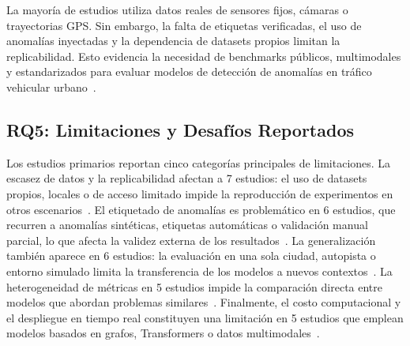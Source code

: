 \documentclass[12pt, a4paper]{article}
\begin{document}
\begin{hallazgo}[]
La mayor\'{i}a de estudios utiliza datos reales de sensores fijos, c\'{a}maras o trayectorias GPS. Sin embargo, la falta de etiquetas verificadas, el uso de anomal\'{i}as inyectadas y la dependencia de datasets propios limitan la replicabilidad. Esto evidencia la necesidad de benchmarks p\'{u}blicos, multimodales y estandarizados para evaluar modelos de detecci\'{o}n de anomal\'{i}as en tr\'{a}fico vehicular urbano~\cite{taheri2026applicability}.
\end{hallazgo}

\subsection{RQ5: Limitaciones y Desaf\'{i}os Reportados}

Los estudios primarios reportan cinco categor\'{i}as principales de limitaciones. La escasez de datos y la replicabilidad afectan a 7 estudios: el uso de datasets propios, locales o de acceso limitado impide la reproducci\'{o}n de experimentos en otros escenarios~\cite{fang2020deep,mao2024detecting,giasemis2025learning}. El etiquetado de anomal\'{i}as es problem\'{a}tico en 6 estudios, que recurren a anomal\'{i}as sint\'{e}ticas, etiquetas autom\'{a}ticas o validaci\'{o}n manual parcial, lo que afecta la validez externa de los resultados~\cite{ren2024graph,wang2024multiscale,jadhav2025multistage}. La generalizaci\'{o}n tambi\'{e}n aparece en 6 estudios: la evaluaci\'{o}n en una sola ciudad, autopista o entorno simulado limita la transferencia de los modelos a nuevos contextos~\cite{mehrannia2023deep,nouri2025self,chakraborty2023structural}. La heterogeneidad de m\'{e}tricas en 5 estudios impide la comparaci\'{o}n directa entre modelos que abordan problemas similares~\cite{riaz2022traffic,jia2025prediction,taheri2026applicability}. Finalmente, el costo computacional y el despliegue en tiempo real constituyen una limitaci\'{o}n en 5 estudios que emplean modelos basados en grafos, Transformers o datos multimodales~\cite{park2025graph,abdallah2025aipurban,duan2025multimodal}.
\end{document}
